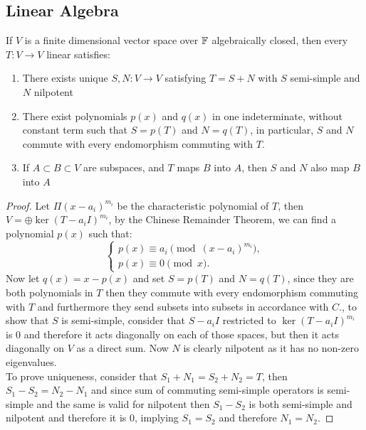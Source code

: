 \subsection*{Linear Algebra}
\begin{prop}
	If $V$ is a finite dimensional vector space over $\mathbb{F}$ algebraically closed, then every $T:V\rightarrow V$ linear satisfies:
	\begin{enumerate}[label=\Alph*]
		\item There exists unique $S,N:V\rightarrow V$ satisfying $T=S+N$ with $S$ semi-simple and $N$ nilpotent
		\item There exist polynomials $p(x)$ and $q(x)$ in one indeterminate, without constant term such that $S=p(T)$ and $N=q(T)$, in particular, $S$ and $N$ commute with every endomorphism commuting with $T$.
		\item If $A \subset B \subset V$ are subspaces, and $T$ maps $B$ into $A$, then $S$ and $N$ also map $B$ into $A$
	\end{enumerate}
	\label{jordandecom}
\end{prop}
	\begin{proof}
		Let $\Pi(x-a_i)^{m_i}$  be the characteristic polynomial of $T$, then $V=\oplus \ker(T-a_iI)^{m_i}$, by the Chinese Remainder Theorem, we can find a polynomial $p(x)$ such that:$$\begin{cases}
		p(x) \equiv a_i \pmod{(x-a_i)^{m_i}},\\
		p(x) \equiv 0 \pmod x.
		\end{cases}$$
		Now let $q(x)=x-p(x)$ and set $S=p(T)$ and $N=q(T)$, since they are both polynomials in $T$ then they commute with every endomorphism commuting with $T$ and furthermore they send subsets into subsets in accordance with $C.$, to show that $S$ is semi-simple, consider that $S-a_iI$ restricted to $\ker(T-a_iI)^{m_i}$ is $0$ and therefore it acts diagonally on each of those spaces, but then it acts diagonally on $V$ as a direct sum. Now $N$ is clearly nilpotent as it has no non-zero eigenvalues.\\
		To prove uniqueness, consider that $S_1 + N_1 = S_2 + N_2 = T$, then $S_1 - S_2 = N_2 - N_1$ and since sum of commuting semi-simple operators is semi-simple and the same is valid for nilpotent then $S_1-S_2$ is both semi-simple and nilpotent and therefore it is $0$, implying $S_1 = S_2$ and therefore $N_1=N_2$.
	\end{proof}
